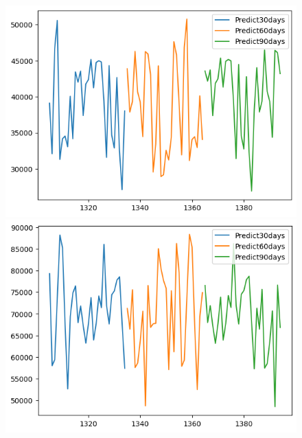 \begin{figure}[H]
        \begin{minipage}{0.15\textwidth}
    \centering
    \includegraphics[width=1\textwidth]{resources/chapter-5/newdata1/predicted/BIDV_ML_9_1_30days.png}
    \end{minipage}
    \hfill
    \begin{minipage}{0.15\textwidth}
    \centering
    \includegraphics[width=1\textwidth]{resources/chapter-5/newdata1/predicted/VCB_ML_7_3_30days.png}
    \end{minipage}
    \hfill
    \begin{minipage}{0.15\textwidth}
    \centering

\end{minipage}
\end{figure}
